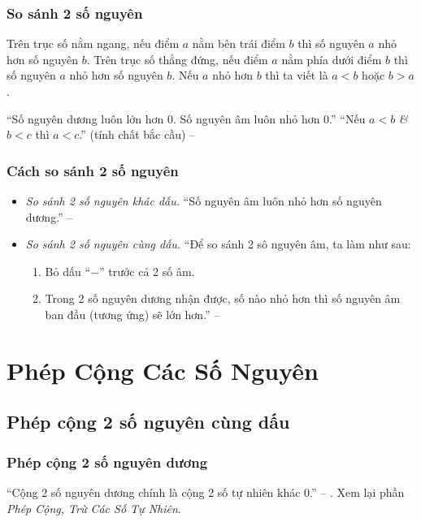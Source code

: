 \documentclass[oneside]{book}
\numberwithin{equation}{section}
\begin{document}
\subsubsection{So sánh 2 số nguyên}
\begin{tcolorbox}
	Trên trục số nằm ngang, nếu điểm $a$ nằm bên trái điểm $b$ thì số nguyên $a$ nhỏ hơn số nguyên $b$. Trên trục số thẳng đứng, nếu điểm $a$ nằm phía dưới điểm $b$ thì số nguyên $a$ nhỏ hơn số nguyên $b$. Nếu $a$ nhỏ hơn $b$ thì ta viết là $a < b$ hoặc $b > a$.
\end{tcolorbox}
``Số nguyên dương luôn lớn hơn 0. Số nguyên âm luôn nhỏ hơn 0.'' ``Nếu $a < b$ \textit{\&} $b < c$ thì $a < c$.'' (tính chất bắc cầu) -- \cite[p. 67]{Thai_Anh_Dat_Ha_Loan_Nam_Quang_Toan_6_tap_1}

\subsubsection{Cách so sánh 2 số nguyên}
\begin{itemize}
	\item \textit{So sánh 2 số nguyên khác dấu.} ``Số nguyên âm luôn nhỏ hơn số nguyên dương.'' -- \cite[p. 68]{Thai_Anh_Dat_Ha_Loan_Nam_Quang_Toan_6_tap_1}
	\item \textit{So sánh 2 số nguyên cùng dấu.} ``Để so sánh 2 sô nguyên âm, ta làm như sau:
	\begin{enumerate}
		\item Bỏ dấu ``$-$'' trước cả 2 số âm.
		\item Trong 2 số nguyên dương nhận được, số nào nhỏ hơn thì số nguyên âm ban đầu (tương ứng) sẽ lớn hơn.'' -- \cite[p. 69]{Thai_Anh_Dat_Ha_Loan_Nam_Quang_Toan_6_tap_1}
	\end{enumerate}
\end{itemize}

\section{Phép Cộng Các Số Nguyên}

\subsection{Phép cộng 2 số nguyên cùng dấu}

\subsubsection{Phép cộng 2 số nguyên dương}
``Cộng 2 số nguyên dương chính là cộng 2 số tự nhiên khác 0.'' -- \cite[p. 70]{Thai_Anh_Dat_Ha_Loan_Nam_Quang_Toan_6_tap_1}. Xem lại phần \textit{Phép Cộng, Trừ Các Số Tự Nhiên}.
\end{document}
